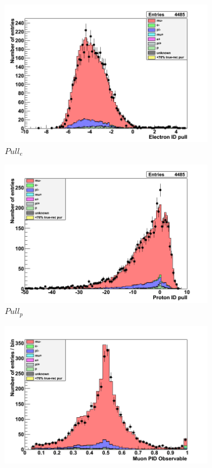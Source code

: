 \begin{figure}[h]
	\begin{subfigure}[t]{0.32\textwidth}
		\includegraphics[width=\textwidth]{figures/numu/Cuts/numu/Elepull_run12}
		\caption{$Pull_e$}
	\end{subfigure}
	\begin{subfigure}[t]{0.32\textwidth}	
		\includegraphics[width=\textwidth]{figures/numu/Cuts/numu/Protpull_run12}
		\caption{$Pull_p$}
	\end{subfigure}
	\begin{subfigure}[t]{0.32\textwidth}
		\includegraphics[width=\textwidth]{figures/numu/Cuts/numu/Mulikelihood_run2}

\end{subfigure}
\end{figure}
